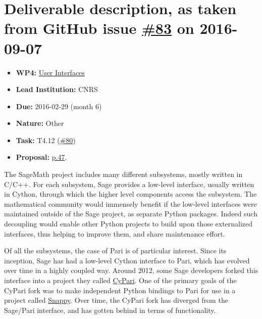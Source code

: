 \section*{\texorpdfstring{Deliverable description, as taken from GitHub
issue
\href{https://github.com/OpenDreamKit/OpenDreamKit/issues/83}{\#83} on
2016-09-07}{Deliverable description, as taken from GitHub issue \#83 on 2016-09-07}}\label{deliverable-description-as-taken-from-github-issues-83-on-2016-09-07}

\begin{itemize}
\tightlist
\item
  \textbf{WP4:}
  \href{https://github.com/OpenDreamKit/OpenDreamKit/tree/master/WP4}{User
  Interfaces}
\item
  \textbf{Lead Institution:} CNRS
\item
  \textbf{Due:} 2016-02-29 (month 6)
\item
  \textbf{Nature:} Other
\item
  \textbf{Task:} T4.12
  (\href{https://github.com/OpenDreamKit/OpenDreamKit/issues/80}{\#80})
\item
  \textbf{Proposal:}
  \href{https://github.com/OpenDreamKit/OpenDreamKit/raw/master/Proposal/proposal-www.pdf}{p.47}.
\end{itemize}

The SageMath project includes many different subsystems, mostly written
in C/C++. For each subsystem, Sage provides a low-level interface,
usually written in Cython, through which the higher level components
access the subsystem. The mathematical community would immensely benefit
if the low-level interfaces were maintained outside of the Sage project,
as separate Python packages. Indeed such decoupling would enable other
Python projects to build upon those externalized interfaces, thus
helping to improve them, and share maintenance effort.

Of all the subsystems, the case of Pari is of particular interest. Since
its inception, Sage has had a low-level Cython interface to Pari, which
has evolved over time in a highly coupled way. Around 2012, some Sage
developers forked this interface into a project they called
\href{https://bitbucket.org/t3m/cypari/}{CyPari}. One of the primary
goals of the CyPari fork was to make independent Python bindings to Pari
for use in a project called
\href{https://bitbucket.org/t3m/snappy}{Snappy}. Over time, the CyPari
fork has diverged from the Sage/Pari interface, and has gotten behind in
terms of functionality.

